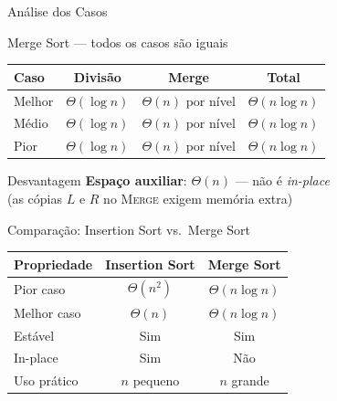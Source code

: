 \documentclass[aspectratio=169]{beamer}
\begin{document}
\begin{frame}{Análise dos Casos}
  \begin{block}{Merge Sort — todos os casos são iguais}
    \begin{center}
      \renewcommand{\arraystretch}{1.3}
      \begin{tabular}{lccc}
        \hline
        \textbf{Caso} & \textbf{Divisão} & \textbf{Merge} & \textbf{Total} \\
        \hline
        Melhor   & $\Theta(\log n)$ & $\Theta(n)$ por nível & $\Theta(n \log n)$ \\
        Médio    & $\Theta(\log n)$ & $\Theta(n)$ por nível & $\Theta(n \log n)$ \\
        Pior     & $\Theta(\log n)$ & $\Theta(n)$ por nível & $\Theta(n \log n)$ \\
        \hline
      \end{tabular}
    \end{center}
  \end{block}

  \vspace{6pt}
  \begin{alertblock}{Desvantagem}
    \textbf{Espaço auxiliar}: $\Theta(n)$ — não é \emph{in-place}\\
    (as cópias $L$ e $R$ no \textsc{Merge} exigem memória extra)
  \end{alertblock}
\end{frame}

\begin{frame}{Comparação: Insertion Sort vs.\ Merge Sort}
  \centering
  \renewcommand{\arraystretch}{1.4}
  \begin{tabular}{lcc}
    \hline
    \textbf{Propriedade} & \textbf{Insertion Sort} & \textbf{Merge Sort} \\
    \hline
    Pior caso    & $\Theta(n^2)$   & $\Theta(n \log n)$ \\
    Melhor caso  & $\Theta(n)$     & $\Theta(n \log n)$ \\
    Estável      & Sim             & Sim \\
    In-place     & Sim             & Não \\
    Uso prático  & $n$ pequeno     & $n$ grande \\
    \hline
  \end{tabular}
\end{frame}

\end{document}
